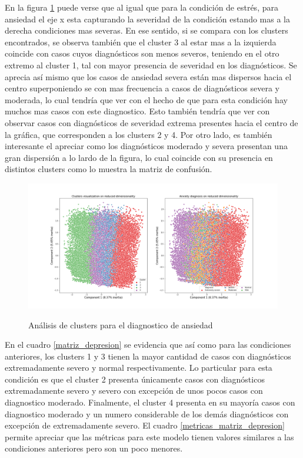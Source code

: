En la figura \ref{clusters_ansiedad} puede verse que al igual que para la condición de estrés, para ansiedad el eje x esta capturando la severidad de la condición estando mas a la derecha condiciones mas severas. En ese sentido, si se compara con los clusters encontrados, se observa también que el cluster 3 al estar mas a la izquierda coincide con casos cuyos diagnósticos son menos severos, teniendo en el otro extremo al cluster 1, tal con mayor presencia de severidad en los diagnósticos. Se aprecia así mismo que los casos de ansiedad severa están mas dispersos hacia el centro superponiendo se con mas frecuencia a casos de diagnósticos severa y moderada, lo cual tendría que ver con el hecho de que para esta condición hay muchos mas casos con este diagnostico. Esto también tendría que ver con observar casos con diagnósticos de severidad extrema presentes hacia el centro de la gráfica, que corresponden a los clusters 2 y 4. Por otro lado, es también interesante el apreciar como los diagnósticos moderado y severa presentan una gran dispersión a lo lardo de la figura, lo cual coincide con su presencia en distintos clusters como lo muestra la matriz de confusión.


\begin{figure}[h]
\caption{Análisis de clusters para el diagnostico de ansiedad}
\centering
\includegraphics[width=\textwidth,height=\textheight,keepaspectratio]{Media/Pictures/anxiety_clusters.png} 
\label{clusters_ansiedad}
\end{figure}

En el cuadro \ref{matriz_depresion} se evidencia que así como para las condiciones anteriores, los clusters 1 y 3 tienen la mayor cantidad de casos con diagnósticos extremadamente severo y normal respectivamente. Lo particular para esta condición es que el cluster 2 presenta únicamente casos con diagnósticos extremadamente severo y severo con excepción de unos pocos casos con diagnostico moderado. Finalmente, el cluster 4 presenta en su mayoría casos con diagnostico moderado y un numero considerable de los demás diagnósticos con excepción de extremadamente severo. El cuadro  \ref{metricas_matriz_depresion} permite apreciar que las métricas para este modelo tienen valores similares a las condiciones anteriores pero son un poco menores.



